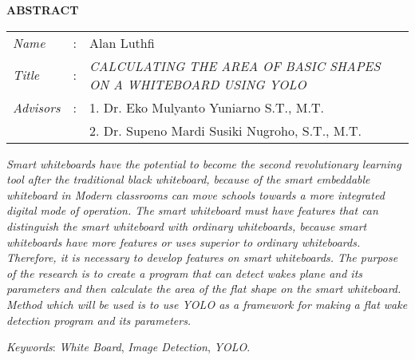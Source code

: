\begin{center}
  \large\textbf{ABSTRACT}
\end{center}


\vspace{2ex}

\begingroup
  \setlength{\tabcolsep}{0pt}

  \noindent
  \begin{tabularx}{\textwidth}{l >{\centering}m{3em} X}
    \emph{Name}     &:& Alan Luthfi \\

    \emph{Title}    &:& \emph{CALCULATING THE AREA OF BASIC SHAPES ON A WHITEBOARD USING YOLO} \\

    \emph{Advisors} &:& 1. Dr. Eko Mulyanto Yuniarno S.T., M.T. \\
                    & & 2. Dr. Supeno Mardi Susiki Nugroho, S.T., M.T. \\
  \end{tabularx}
\endgroup

\emph{Smart whiteboards have the potential to become the second revolutionary learning tool
	after the traditional black whiteboard, because of the smart embeddable whiteboard in
	Modern classrooms can move schools towards a more integrated digital mode of operation. The smart whiteboard must have features that can distinguish the smart whiteboard
	with ordinary whiteboards, because smart whiteboards have more features or uses
	superior to ordinary whiteboards. Therefore, it is necessary to develop features on smart whiteboards. The purpose of the research is to create a program that can detect wakes
	plane and its parameters and then calculate the area of the flat shape on the smart whiteboard. Method
	which will be used is to use YOLO as a framework for
	making a flat wake detection program and its parameters.}

\emph{Keywords}: \emph{White Board}, \emph{Image Detection}, \emph{YOLO}.
